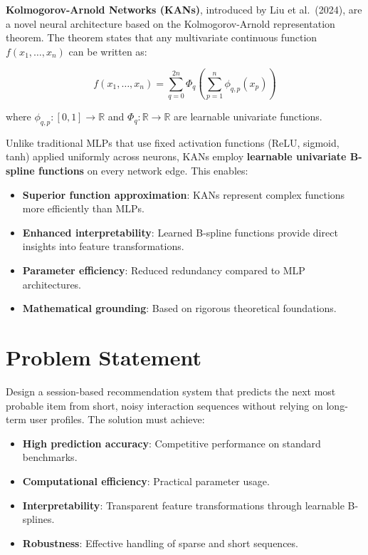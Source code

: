 \documentclass[12pt,a4paper]{report}
\begin{document}
\textbf{Kolmogorov-Arnold Networks (KANs)}, introduced by Liu et al.\ (2024),
are a novel neural architecture based on the Kolmogorov-Arnold representation
theorem. The theorem states that any multivariate continuous function
$f(x_1, \ldots, x_n)$ can be written as:

\begin{equation}
f(x_1, \ldots, x_n) = \sum_{q=0}^{2n} \Phi_q \left( \sum_{p=1}^{n} \phi_{q,p}(x_p) \right)
\end{equation}

where $\phi_{q,p}: [0,1] \to \mathbb{R}$ and $\Phi_q: \mathbb{R} \to \mathbb{R}$
are learnable univariate functions.

Unlike traditional MLPs that use fixed activation functions (ReLU, sigmoid, tanh)
applied uniformly across neurons, KANs employ \textbf{learnable univariate
B-spline functions} on every network edge. This enables:

\begin{itemize}
    \item \textbf{Superior function approximation}: KANs represent complex
          functions more efficiently than MLPs.
    \item \textbf{Enhanced interpretability}: Learned B-spline functions provide
          direct insights into feature transformations.
    \item \textbf{Parameter efficiency}: Reduced redundancy compared to MLP
          architectures.
    \item \textbf{Mathematical grounding}: Based on rigorous theoretical
          foundations.
\end{itemize}

\section{Problem Statement}

Design a session-based recommendation system that predicts the next most probable
item from short, noisy interaction sequences without relying on long-term user
profiles. The solution must achieve:

\begin{itemize}
    \item \textbf{High prediction accuracy}: Competitive performance on standard
          benchmarks.
    \item \textbf{Computational efficiency}: Practical parameter usage.
    \item \textbf{Interpretability}: Transparent feature transformations through
          learnable B-splines.
    \item \textbf{Robustness}: Effective handling of sparse and short sequences.
\end{itemize}
\end{document}
